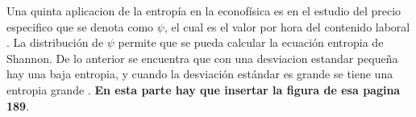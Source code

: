 Una quinta aplicacion de la entropía en la econofísica es en el estudio del precio especifico que se denota como $\psi$, el cual es el valor por hora del contenido laboral \citep[][]{cottrell_classical_2009}. La distribución de $\psi$ permite que se pueda calcular la ecuación entropia de Shannon. De lo anterior se encuentra que con una desviacion estandar pequeña hay una baja entropia, y cuando la desviación estándar es grande se tiene una entropia grande \citep[][pagina 189]{cottrell_classical_2009}. \textbf{En esta parte hay que insertar la figura de esa pagina 189}.


